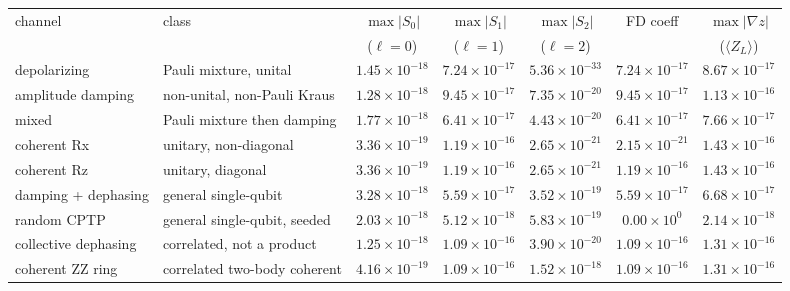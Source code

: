 \documentclass[10pt,a4paper]{article}
\begin{document}
\begin{longtable}{llccccc}
\toprule channel & class & $\max\lvert S_0\rvert$ & $\max\lvert S_1\rvert$ & $\max\lvert S_2\rvert$ & FD coeff & $\max\lvert\nabla z\rvert$ \\
 & & ($\ell{=}0$) & ($\ell{=}1$) & ($\ell{=}2$) & & ($\langle Z_L\rangle$) \\ \midrule
depolarizing & Pauli mixture, unital & $1.45\times 10^{-18}$ & $7.24\times 10^{-17}$ & $5.36\times 10^{-33}$ & $7.24\times 10^{-17}$ & $8.67\times 10^{-17}$ \\
amplitude damping & non-unital, non-Pauli Kraus & $1.28\times 10^{-18}$ & $9.45\times 10^{-17}$ & $7.35\times 10^{-20}$ & $9.45\times 10^{-17}$ & $1.13\times 10^{-16}$ \\
mixed & Pauli mixture then damping & $1.77\times 10^{-18}$ & $6.41\times 10^{-17}$ & $4.43\times 10^{-20}$ & $6.41\times 10^{-17}$ & $7.66\times 10^{-17}$ \\
coherent Rx & unitary, non-diagonal & $3.36\times 10^{-19}$ & $1.19\times 10^{-16}$ & $2.65\times 10^{-21}$ & $2.15\times 10^{-21}$ & $1.43\times 10^{-16}$ \\
coherent Rz & unitary, diagonal & $3.36\times 10^{-19}$ & $1.19\times 10^{-16}$ & $2.65\times 10^{-21}$ & $1.19\times 10^{-16}$ & $1.43\times 10^{-16}$ \\
damping + dephasing & general single-qubit & $3.28\times 10^{-18}$ & $5.59\times 10^{-17}$ & $3.52\times 10^{-19}$ & $5.59\times 10^{-17}$ & $6.68\times 10^{-17}$ \\
random CPTP & general single-qubit, seeded & $2.03\times 10^{-18}$ & $5.12\times 10^{-18}$ & $5.83\times 10^{-19}$ & $0.00\times 10^{0}$ & $2.14\times 10^{-18}$ \\
collective dephasing & correlated, not a product & $1.25\times 10^{-18}$ & $1.09\times 10^{-16}$ & $3.90\times 10^{-20}$ & $1.09\times 10^{-16}$ & $1.31\times 10^{-16}$ \\
coherent ZZ ring & correlated two-body coherent & $4.16\times 10^{-19}$ & $1.09\times 10^{-16}$ & $1.52\times 10^{-18}$ & $1.09\times 10^{-16}$ & $1.31\times 10^{-16}$ \\
\bottomrule\end{longtable}
\end{document}
